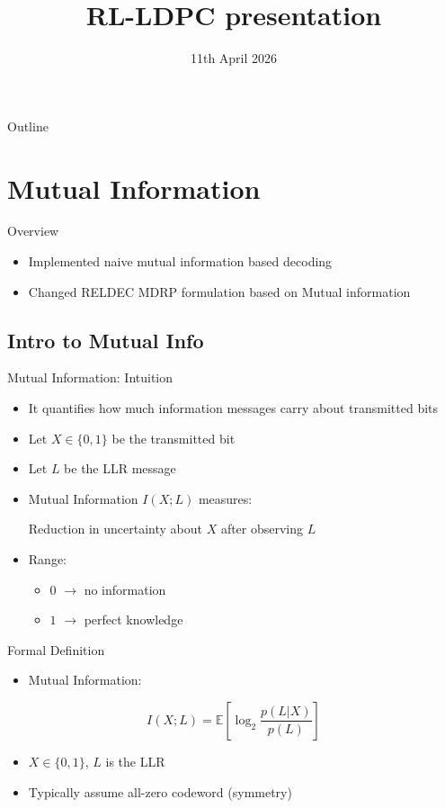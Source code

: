 \documentclass{beamer}
\title{RL-LDPC presentation}
\author{}
\institute{}
\date{11th April 2026}
\begin{document}
\frame{\titlepage}

\begin{frame}{Outline}
  \tableofcontents
\end{frame}

\section{Mutual Information}
\begin{frame}{Overview}
\begin{itemize}
    \item Implemented naive mutual information based decoding
    \item Changed RELDEC MDRP formulation based on Mutual information
\end{itemize}
\end{frame}
\subsection{Intro to Mutual Info}
\begin{frame}{Mutual Information: Intuition}
\begin{itemize}
    \item It quantifies how much information messages carry about transmitted bits
    \item Let $X \in \{0,1\}$ be the transmitted bit
    \item Let $L$ be the LLR message
    \item Mutual Information $I(X;L)$ measures:
    \begin{block}{}
        Reduction in uncertainty about $X$ after observing $L$
    \end{block}
    \item Range:
    \begin{itemize}
        \item $0$ $\rightarrow$ no information
        \item $1$ $\rightarrow$ perfect knowledge
    \end{itemize}
\end{itemize}
\end{frame}

\begin{frame}{Formal Definition}
\begin{itemize}
    \item Mutual Information:
\end{itemize}

\[
I(X;L) = \mathbb{E}\left[\log_2 \frac{p(L|X)}{p(L)}\right]
\]

\begin{itemize}
    \item $X \in \{0,1\}$, $L$ is the LLR
    \item Typically assume all-zero codeword (symmetry)
\end{itemize}
\end{frame}
\end{document}
